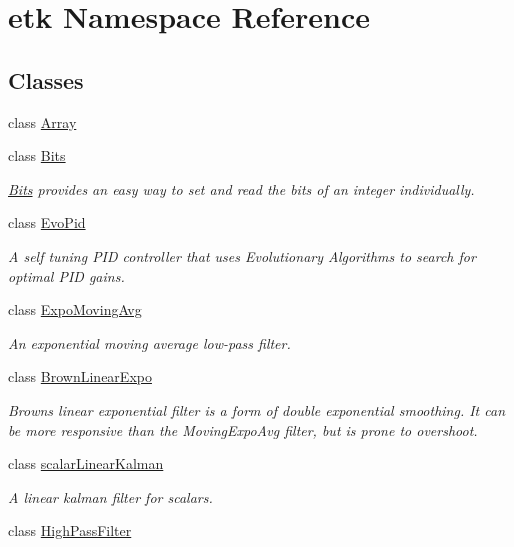 \hypertarget{namespaceetk}{\section{etk Namespace Reference}
\label{namespaceetk}
}
\subsection*{Classes}
\begin{DoxyCompactItemize}
\item 
class \hyperlink{classetk_1_1_array}{Array}
\item 
class \hyperlink{classetk_1_1_bits}{Bits}
\begin{DoxyCompactList}\small\item\em \hyperlink{classetk_1_1_bits}{Bits} provides an easy way to set and read the bits of an integer individually. \end{DoxyCompactList}\item 
class \hyperlink{classetk_1_1_evo_pid}{Evo\-Pid}
\begin{DoxyCompactList}\small\item\em A self tuning P\-I\-D controller that uses Evolutionary Algorithms to search for optimal P\-I\-D gains. \end{DoxyCompactList}\item 
class \hyperlink{classetk_1_1_expo_moving_avg}{Expo\-Moving\-Avg}
\begin{DoxyCompactList}\small\item\em An exponential moving average low-\/pass filter. \end{DoxyCompactList}\item 
class \hyperlink{classetk_1_1_brown_linear_expo}{Brown\-Linear\-Expo}
\begin{DoxyCompactList}\small\item\em Browns linear exponential filter is a form of double exponential smoothing. It can be more responsive than the Moving\-Expo\-Avg filter, but is prone to overshoot. \end{DoxyCompactList}\item 
class \hyperlink{classetk_1_1scalar_linear_kalman}{scalar\-Linear\-Kalman}
\begin{DoxyCompactList}\small\item\em A linear kalman filter for scalars. \end{DoxyCompactList}\item 
class \hyperlink{classetk_1_1_high_pass_filter}{High\-Pass\-Filter}

\end{DoxyCompactItemize}
